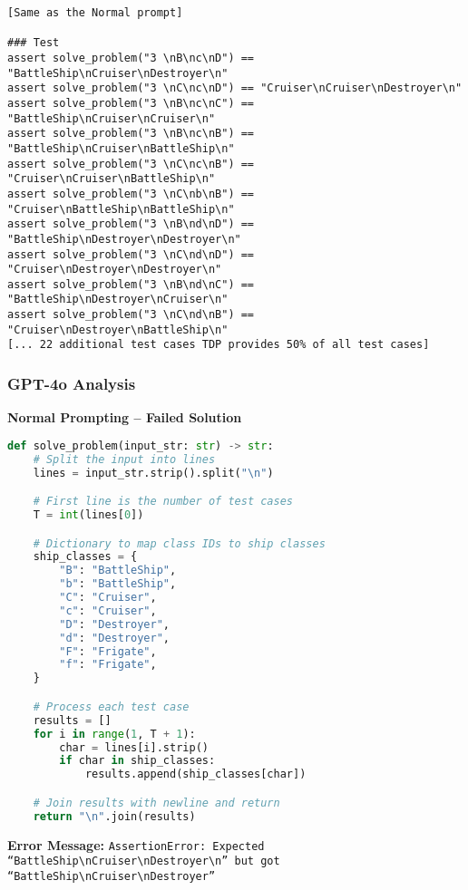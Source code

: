 \documentclass{article}
\begin{document}
\begin{lstlisting}
[Same as the Normal prompt]

### Test
assert solve_problem("3 \nB\nc\nD") == "BattleShip\nCruiser\nDestroyer\n"
assert solve_problem("3 \nC\nc\nD") == "Cruiser\nCruiser\nDestroyer\n"
assert solve_problem("3 \nB\nc\nC") == "BattleShip\nCruiser\nCruiser\n"
assert solve_problem("3 \nB\nc\nB") == "BattleShip\nCruiser\nBattleShip\n"
assert solve_problem("3 \nC\nc\nB") == "Cruiser\nCruiser\nBattleShip\n"
assert solve_problem("3 \nC\nb\nB") == "Cruiser\nBattleShip\nBattleShip\n"
assert solve_problem("3 \nB\nd\nD") == "BattleShip\nDestroyer\nDestroyer\n"
assert solve_problem("3 \nC\nd\nD") == "Cruiser\nDestroyer\nDestroyer\n"
assert solve_problem("3 \nB\nd\nC") == "BattleShip\nDestroyer\nCruiser\n"
assert solve_problem("3 \nC\nd\nB") == "Cruiser\nDestroyer\nBattleShip\n"
[... 22 additional test cases TDP provides 50% of all test cases]
\end{lstlisting}

\subsubsection{GPT-4o Analysis}

\textbf{Normal Prompting -- Failed Solution}
\begin{lstlisting}[language=python]
def solve_problem(input_str: str) -> str:
    # Split the input into lines
    lines = input_str.strip().split("\n")

    # First line is the number of test cases
    T = int(lines[0])

    # Dictionary to map class IDs to ship classes
    ship_classes = {
        "B": "BattleShip",
        "b": "BattleShip",
        "C": "Cruiser",
        "c": "Cruiser",
        "D": "Destroyer",
        "d": "Destroyer",
        "F": "Frigate",
        "f": "Frigate",
    }

    # Process each test case
    results = []
    for i in range(1, T + 1):
        char = lines[i].strip()
        if char in ship_classes:
            results.append(ship_classes[char])

    # Join results with newline and return
    return "\n".join(results)
\end{lstlisting}

\textbf{Error Message:}
\texttt{AssertionError: Expected ``BattleShip\textbackslash nCruiser\textbackslash nDestroyer\textbackslash n'' but got ``BattleShip\textbackslash nCruiser\textbackslash nDestroyer''}
\end{document}

